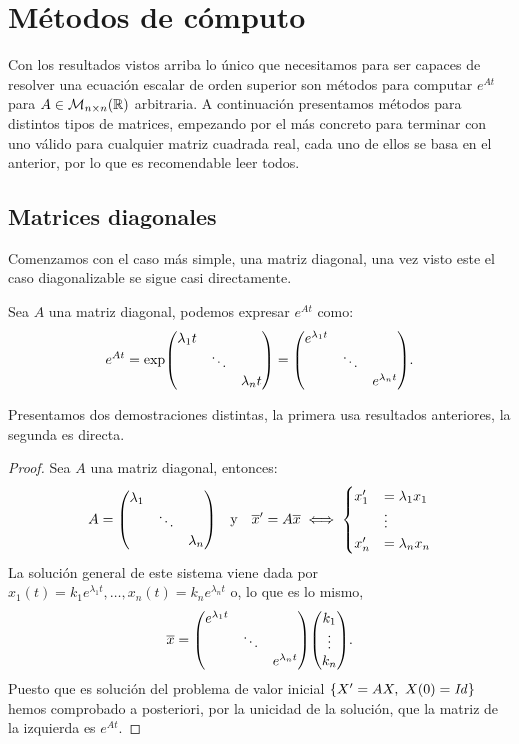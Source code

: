 \documentclass[../ecuaciones_diferenciales.tex]{subfiles}
\begin{document}
\section{Métodos de cómputo}

Con los resultados vistos arriba lo único que necesitamos para ser capaces de
resolver una ecuación escalar de orden superior son métodos para computar 
\(e^{A t}\) para \(A \in \mathcal{M}_{n \times n}(\mathbb{R})\) arbitraria. 
A continuación presentamos métodos para distintos tipos de matrices, empezando
por el más concreto para terminar con uno válido para cualquier matriz cuadrada
real, cada uno de ellos se basa en el anterior, por lo que es recomendable
leer todos.

\subsection{Matrices diagonales}

Comenzamos con el caso más simple, una matriz diagonal, una vez visto este el
caso diagonalizable se sigue casi directamente.

\begin{proposition}
	Sea \(A\) una matriz diagonal, podemos expresar \(e^{At}\) como:
	\[e^{At} = \exp\mat{\lambda_1t & & \\ & \ddots & \\ & & \lambda_nt}
		= \mat{e^{\lambda_1 t} & & \\ & \ddots & \\ & & e^{\lambda_n t}}.\]
\end{proposition}

Presentamos dos demostraciones distintas, la primera usa resultados anteriores,
la segunda es directa.

\begin{proof}
	Sea \(A\) una matriz diagonal, entonces:
	\[A = \mat{
			\lambda_1 & & \\
			& \ddots & \\
			& & \lambda_n}
		\quad \text{y} \quad
		\vec{x}' = A\vec{x} \iff
		\eqsys{
			x'_1 &= \lambda_1 x_1 \\
			&\vdots \\
			x'_n &= \lambda_n x_n \\
		}
	\]
	La solución general de este sistema viene dada por
	\(x_1(t) = k_1 e^{\lambda_1 t}, \dots, x_n(t) = k_n e^{\lambda_n t}\) o, 
	lo que es lo mismo,
	\[\vec{x} = \mat{e^{\lambda_1 t} & & \\ & \ddots & \\ & & e^{\lambda_n t}}
		\mat{k_1 \\ \vdots \\ k_n}.\]
	Puesto que es solución del problema de valor inicial
	\(\set{X' = AX,\ X(0) = \mathit{Id}}\) hemos comprobado a posteriori, por
	la unicidad de la solución, que la matriz de la izquierda es \(e^{At}\). 
\end{proof}
\end{document}
